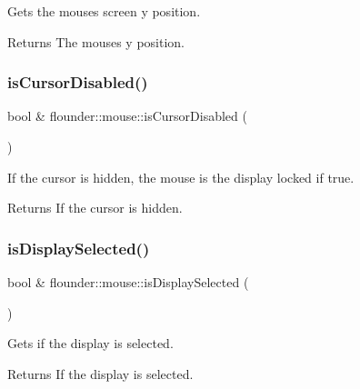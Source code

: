 Gets the mouses screen y position. 

\begin{DoxyReturn}{Returns}
The mouses y position. 
\end{DoxyReturn}
\mbox{\label{classflounder_1_1mouse_a926fbecc60a04f4ca3bc3e8afa9382d4}} 
\subsubsection{\texorpdfstring{is\+Cursor\+Disabled()}{isCursorDisabled()}}
{\footnotesize\ttfamily bool \& flounder\+::mouse\+::is\+Cursor\+Disabled (\begin{DoxyParamCaption}{ }\end{DoxyParamCaption})}



If the cursor is hidden, the mouse is the display locked if true. 

\begin{DoxyReturn}{Returns}
If the cursor is hidden. 
\end{DoxyReturn}
\mbox{\label{classflounder_1_1mouse_af10548a35c672453067ca5adb3da1787}} 
\subsubsection{\texorpdfstring{is\+Display\+Selected()}{isDisplaySelected()}}
{\footnotesize\ttfamily bool \& flounder\+::mouse\+::is\+Display\+Selected (\begin{DoxyParamCaption}{ }\end{DoxyParamCaption})}



Gets if the display is selected. 

\begin{DoxyReturn}{Returns}
If the display is selected. 
\end{DoxyReturn}
\mbox{\label{classflounder_1_1mouse_aff9750c7d68e93aea4c2d3c447677a9e}} 
